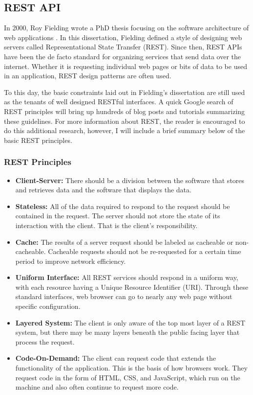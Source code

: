 \subsection{REST API}
In 2000, Roy Fielding wrote a PhD thesis focusing on the software architecture of web applications \cite{fieldingArchitecturalStylesDesign2000}.  In this dissertation, Fielding defined a style of designing web servers called Representational State Transfer (REST).  Since then, REST APIs have been the de facto standard for organizing services that send data over the internet.  Whether it is requesting individual web pages or bits of data to be used in an application, REST design patterns are often used. 

To this day, the basic constraints laid out in Fielding's dissertation are still used as the tenants of well designed RESTful interfaces.  A quick Google search of REST principles will bring up hundreds of blog posts and tutorials summarizing these guidelines. For more information about REST, the reader is encouraged to do this additional research, however, I will include a brief summary below of the basic REST principles.

\subsubsection{REST Principles}

\begin{itemize}
    \item \textbf{Client-Server:} There should be a division between the software that stores and retrieves data and the software that displays the data.
    \item \textbf{Stateless:} All of the data required to respond to the request should be contained in the request. The server should not store the state of its interaction with the client. That is the client's responsibility.
    \item \textbf{Cache:} The results of a server request should be labeled as cacheable or non-cacheable.  Cacheable requests should not be re-requested for a certain time period to improve network efficiency.
    \item \textbf{Uniform Interface:} All REST services should respond in a uniform way, with each resource having a Unique Resource Identifier (URI).  Through these standard interfaces, web browser can go to nearly any web page without specific configuration.
    \item \textbf{Layered System:} The client is only aware of the top most layer of a REST system, but there may be many layers beneath the public facing layer that process the request.
    \item \textbf{Code-On-Demand:} The client can request code that extends the functionality of the application.  This is the basis of how browsers work.  They request code in the form of HTML, CSS, and JavaScript, which run on the machine and also often continue to request more code.
\end{itemize}

